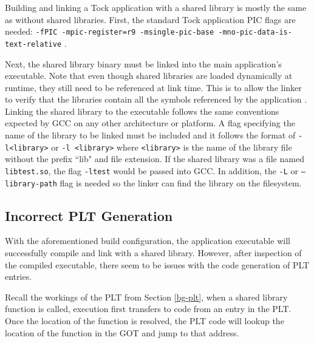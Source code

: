 \documentclass[12pt]{ucsddissertation}
\begin{document}
Building and linking a Tock application with a shared library is mostly the same as without shared libraries. First, the standard Tock application PIC flags are needed: \texttt{-fPIC -mpic-register=r9 -msingle-pic-base -mno-pic-data-is-text-relative} \cite{tock-compilation}.

Next, the shared library binary must be linked into the main application's executable. Note that even though shared libraries are loaded dynamically at runtime, they still need to be referenced at link time. This is to allow the linker to verify that the libraries contain all the symbols referenced by the application \cite{shared-building}. Linking the shared library to the executable follows the same conventions expected by GCC on any other architecture or platform. A flag specifying the name of the library to be linked must be included and it follows the format of \texttt{-l<library>} or \texttt{-l <library>} where \texttt{<library>} is the name of the library file without the prefix ``lib" and file extension. If the shared library was a file named \texttt{libtest.so}, the flag \texttt{-ltest} would be passed into GCC. In addition, the \texttt{-L} or \texttt{--library-path} flag is needed so the linker can find the library on the filesystem.

\subsection{Incorrect PLT Generation} \label{incorrect-plt}
With the aforementioned build configuration, the application executable will successfully compile and link with a shared library. However, after inspection of the compiled executable, there seem to be issues with the code generation of PLT entries.

Recall the workings of the PLT from Section \ref{bg-plt}, when a shared library function is called, execution first transfers to code from an entry in the PLT. Once the location of the function is resolved, the PLT code will lookup the location of the function in the GOT and jump to that address.
\end{document}
